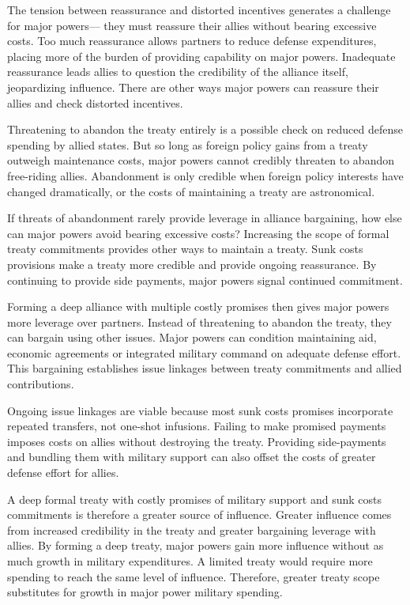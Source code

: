 \documentclass[12pt]{article}
\begin{document}
The tension between reassurance and distorted incentives generates a challenge for major powers--- they must reassure their allies without bearing excessive costs.
Too much reassurance allows partners to reduce defense expenditures, placing more of the burden of providing capability on major powers. 
Inadequate reassurance leads allies to question the credibility of the alliance itself, jeopardizing influence.   
There are other ways major powers can reassure their allies and check distorted incentives. 


Threatening to abandon the treaty entirely is a possible check on reduced defense spending by allied states. 
But so long as foreign policy gains from a treaty outweigh maintenance costs, major powers cannot credibly threaten to abandon free-riding allies. 
Abandonment is only credible when foreign policy interests have changed dramatically, or the costs of maintaining a treaty are astronomical. 


If threats of abandonment rarely provide leverage in alliance bargaining, how else can major powers avoid bearing excessive costs? 
Increasing the scope of formal treaty commitments provides other ways to maintain a treaty.
Sunk costs provisions make a treaty more credible and provide ongoing reassurance.
By continuing to provide side payments, major powers signal continued commitment. 

 
Forming a deep alliance with multiple costly promises then gives major powers more leverage over partners. 
Instead of threatening to abandon the treaty, they can bargain using other issues. 
Major powers can condition maintaining aid, economic agreements or integrated military command on adequate defense effort.
This bargaining establishes issue linkages between treaty commitments and allied contributions. 


Ongoing issue linkages are viable because most sunk costs promises incorporate repeated transfers, not one-shot infusions. 
Failing to make promised payments imposes costs on allies without destroying the treaty. 
Providing side-payments and bundling them with military support can also offset the costs of greater defense effort for allies. 


A deep formal treaty with costly promises of military support and sunk costs commitments is therefore a greater source of influence.
Greater influence comes from increased credibility in the treaty and greater bargaining leverage with allies.  
By forming a deep treaty, major powers gain more influence without as much growth in military expenditures. 
A limited treaty would require more spending to reach the same level of influence. 
Therefore, greater treaty scope substitutes for growth in major power military spending. 
\end{document}
